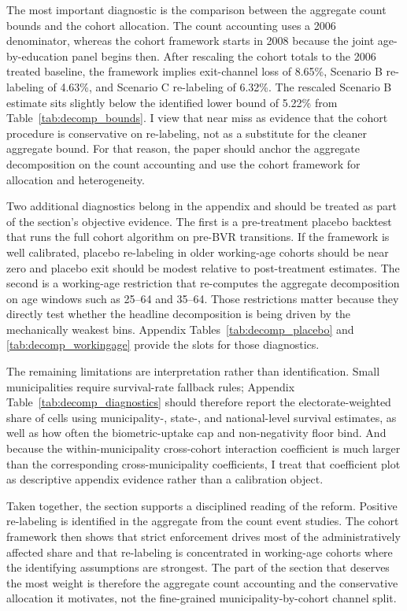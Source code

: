 The most important diagnostic is the comparison between the aggregate count bounds and the cohort allocation. The count accounting uses a 2006 denominator, whereas the cohort framework starts in 2008 because the joint age-by-education panel begins then. After rescaling the cohort totals to the 2006 treated baseline, the framework implies exit-channel loss of 8.65\%, Scenario B re-labeling of 4.63\%, and Scenario C re-labeling of 6.32\%. The rescaled Scenario B estimate sits slightly below the identified lower bound of 5.22\% from Table~\ref{tab:decomp_bounds}. I view that near miss as evidence that the cohort procedure is conservative on re-labeling, not as a substitute for the cleaner aggregate bound. For that reason, the paper should anchor the aggregate decomposition on the count accounting and use the cohort framework for allocation and heterogeneity.

Two additional diagnostics belong in the appendix and should be treated as part of the section's objective evidence. The first is a pre-treatment placebo backtest that runs the full cohort algorithm on pre-BVR transitions. If the framework is well calibrated, placebo re-labeling in older working-age cohorts should be near zero and placebo exit should be modest relative to post-treatment estimates. The second is a working-age restriction that re-computes the aggregate decomposition on age windows such as 25--64 and 35--64. Those restrictions matter because they directly test whether the headline decomposition is being driven by the mechanically weakest bins. Appendix Tables~\ref{tab:decomp_placebo} and \ref{tab:decomp_workingage} provide the slots for those diagnostics.

The remaining limitations are interpretation rather than identification. Small municipalities require survival-rate fallback rules; Appendix Table~\ref{tab:decomp_diagnostics} should therefore report the electorate-weighted share of cells using municipality-, state-, and national-level survival estimates, as well as how often the biometric-uptake cap and non-negativity floor bind. And because the within-municipality cross-cohort interaction coefficient is much larger than the corresponding cross-municipality coefficients, I treat that coefficient plot as descriptive appendix evidence rather than a calibration object.

Taken together, the section supports a disciplined reading of the reform. Positive re-labeling is identified in the aggregate from the count event studies. The cohort framework then shows that strict enforcement drives most of the administratively affected share and that re-labeling is concentrated in working-age cohorts where the identifying assumptions are strongest. The part of the section that deserves the most weight is therefore the aggregate count accounting and the conservative allocation it motivates, not the fine-grained municipality-by-cohort channel split.
